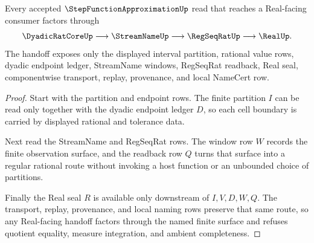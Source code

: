 \begin{theorem}
\label{thm:step-function-approximation-regseqrat-handoff}
Every accepted $\StepFunctionApproximationUp$ read that reaches a Real-facing consumer factors through
$$
\DyadicRatCoreUp \longrightarrow \StreamNameUp \longrightarrow \RegSeqRatUp \longrightarrow \RealUp .
$$
The handoff exposes only the displayed interval partition, rational value rows, dyadic endpoint ledger, StreamName windows, RegSeqRat readback, Real seal, componentwise transport, replay, provenance, and local NameCert row.
\end{theorem}
\begin{proof}
Start with the partition and endpoint rows. The finite partition $I$ can be read only together with the dyadic endpoint ledger $D$, so each cell boundary is carried by displayed rational and tolerance data.

Next read the StreamName and RegSeqRat rows. The window row $W$ records the finite observation surface, and the readback row $Q$ turns that surface into a regular rational route without invoking a host function or an unbounded choice of partitions.

Finally the Real seal $R$ is available only downstream of $I,V,D,W,Q$. The transport, replay, provenance, and local naming rows preserve that same route, so any Real-facing handoff factors through the named finite surface and refuses quotient equality, measure integration, and ambient completeness.
\end{proof}


\begin{closurestatus}{\StepFunctionApproximationUp}
  \theoryclosure{\seedClosure}
  \formalstatus{\unformalizedV}
\end{closurestatus}
